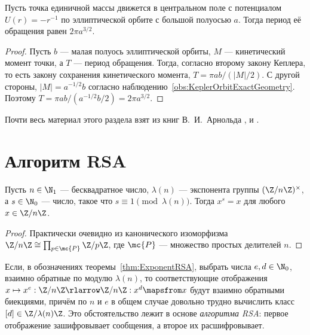 \documentclass[
	extrafontsizes,
	11pt,
	hyphens,
]{memoir}
\begin{document}
\begin{theorem}
Пусть точка единичной массы движется в центральном поле с потенциалом \(U(r) = - r^{-1}\) по эллиптической орбите с большой полуосью \(a\).
Тогда период её обращения равен \(2 \pi a^{3/2}\).
\end{theorem}

\begin{proof}
Пусть \(b\) --- малая полуось эллиптической орбиты, \(M\) --- кинетический момент точки, а \(T\) --- период обращения.
Тогда, согласно второму закону Кеплера, то есть закону сохранения кинетического момента, \(T = \pi a b / (\lvert M \rvert / 2)\).
С другой стороны, \(\lvert M \rvert = a^{-1/2} b\)
согласно наблюдению~\ref{obs:KeplerOrbitExactGeometry}.
Поэтому \(T = \pi a b / (a^{-1/2} b / 2) = 2 \pi a^{3/2}\).
\end{proof}

\begin{remark}
Почти весь материал этого раздела взят из книг В.~И.~Арнольда \cite[42]{arnold_mmkm}, \cite[29]{arnold_ponimanie} и \cite[75]{arnold_ngbg}.
\end{remark}


\section{Алгоритм RSA}

\begin{theorem}
Пусть \(n \in \N_1\) --- бесквадратное число,
\(\lambda(n)\) --- экспонента группы \((\Z / n\Z)^{\times}\),
а \(s \in \N_0\) --- число, такое что \(s \equiv 1 \pmod{\lambda(n)}\).%
\label{thm:ExponentRSA}
Тогда \(x^s = x\) для любого \(x \in \Z / n\Z\).
\end{theorem}

\begin{proof}
Практически очевидно из канонического изоморфизма
\(\Z / n\Z \cong \prod_{p \in \mc{P}} \Z / p\Z\),
где \(\mc{P}\) --- множество простых делителей \(n\).
\end{proof}

\begin{remark}
Если, в обозначениях теоремы~\ref{thm:ExponentRSA}, выбрать числа \(e, d \in \N_0\),
взаимно обратные по модулю \(\lambda(n)\),
то соответствующие отображения
\(x \mapsto x^e : \Z / n\Z \rlarrow \Z / n\Z : x^d \mapsfrom x\)
будут взаимно обратными биекциями,
причём по \(n\) и \(e\) в общем случае довольно трудно вычислить класс \([d] \in \Z / \lambda(n) \Z\).
Это обстоятельство лежит в основе \emph{алгоритма RSA}:
первое отображение зашифровывает сообщения, а второе их расшифровывает.
\end{remark}
\end{document}
